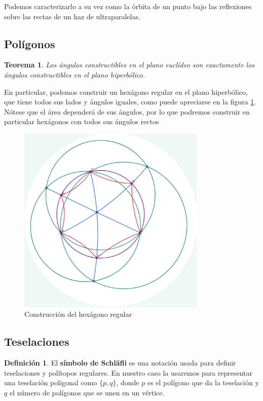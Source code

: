 \documentclass{article}
\theoremstyle{plain}
\newtheorem{theorem}{Teorema}
\theoremstyle{definition}
\newtheorem{definition}{Definición}
\theoremstyle{remark}
\begin{document}
Podemos caracterizarlo a su vez como la órbita de un punto bajo las reflexiones
sobre las rectas de un haz de ultraparalelas.\cite{coxeter}



\subsection{Polígonos}
\begin{theorem}
  Los ángulos constructibles en el plano euclídeo son exactamente los ángulos
  constructibles en el plano hiperbólico. \cite{jagy95}
\end{theorem}

En particular, podemos construir un hexágono regular en el plano
hiperbólico, que tiene todos sus lados y ángulos iguales, como puede
apreciarse en la figura \ref{hexagon}. Nótese que el área dependerá de
sus ángulos, por lo que podremos construir en particular hexágonos con
todos sus ángulos rectos

\begin{figure}[ht!]
\centering
\includegraphics[width=90mm]{./hexagon.png}
\caption{Construcción del hexágono regular \label{hexagon}}
\end{figure}

\subsection{Teselaciones}
\begin{definition}
  El \textbf{símbolo de Schläfli} es una notación usada para definir
  teselaciones y polítopos regulares. En nuestro caso la usaremos para
  representar una teselación poligonal como $\{p,q\}$, donde $p$ es el
  polígono que da la teselación y $q$ el número de polígonos que se unen
  en un vértice.
\end{definition}
\end{document}
